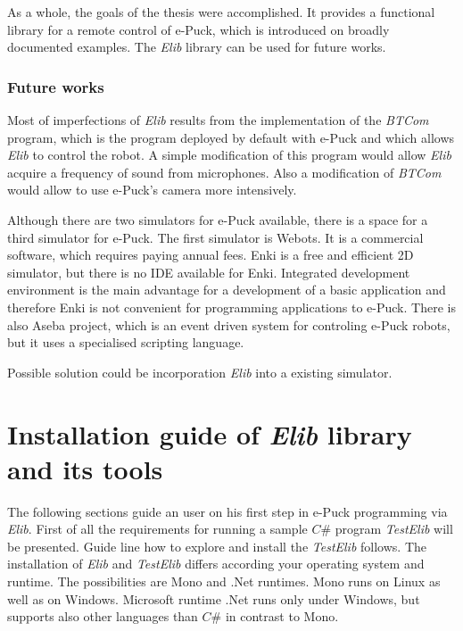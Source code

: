 \documentclass[12pt,notitlepage]{report}
\begin{document}
	As a whole, the goals of the thesis were accomplished. It provides a functional library for
	a remote control of e-Puck, which is introduced on broadly documented examples.
	The {\it Elib} library can be used for future works.

\subsection*{Future works}
	Most of imperfections of {\it Elib} results from the implementation of the {\it BTCom} program,
	which is the program deployed by default with e-Puck and which allows {\it Elib} to control the robot.
	A simple modification of this program would allow {\it Elib} acquire a frequency of sound from microphones.
	Also a modification of {\it BTCom} would allow to use e-Puck's camera more intensively.

	Although there are two simulators for e-Puck available, there is a space for a third simulator for e-Puck.
	The first simulator is Webots. It is a commercial software, which requires paying annual fees.
	Enki is a free and efficient 2D simulator, but there is no IDE available for Enki. Integrated
	development environment is the main advantage for a development of a basic application and therefore Enki is not
	convenient for programming applications to e-Puck.
	There is also Aseba project, which is an event driven system for controling e-Puck robots, 
	but it uses a specialised scripting language.

	Possible solution could be incorporation {\it Elib} into a existing simulator.
\appendix
\chapter{Installation guide of {\it Elib} library and its tools} \label{app:installelib}
	The following sections guide an user on his first step in e-Puck programming via {\it Elib}.
	First of all the requirements for running a sample $C\#$ program {\it TestElib} will be presented.
	Guide line how to explore and install the {\it TestElib} follows.
	The installation of {\it Elib} and {\it TestElib} differs according your operating system and runtime.
	The possibilities are Mono\cite{mono} and .Net runtimes. Mono runs on Linux as well as on Windows. Microsoft runtime .Net
	runs only under Windows, but supports also other languages than $C\#$ in contrast to Mono.
\end{document}
